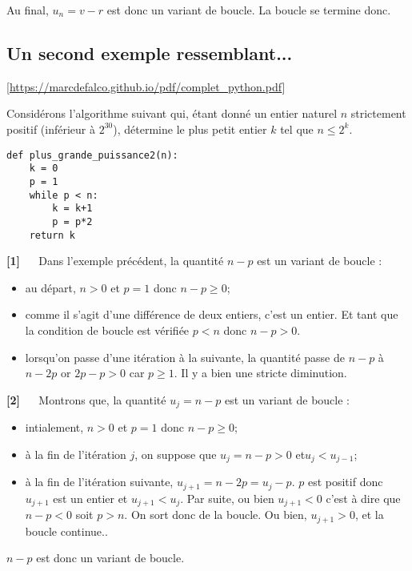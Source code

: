 Au final, $u_n = v-r$ est donc un variant de boucle. La boucle se termine donc.


\subsection{Un second exemple ressemblant...} 

\begin{flushright}
\footnotesize
[\url{https://marcdefalco.github.io/pdf/complet_python.pdf}]
\normalsize
\end{flushright}

Considérons l’algorithme suivant qui, étant donné un entier naturel $n$ strictement positif (inférieur à $2^{30}$), détermine le plus petit entier $k$ tel que $n \leq 2^k$.
\begin{lstlisting}
def plus_grande_puissance2(n):
    k = 0
    p = 1
    while p < n:
        k = k+1
        p = p*2
    return k
\end{lstlisting}
\begin{demo}\textbf{[1]} $\quad$
Dans l’exemple précédent, la quantité $n - p$ est un variant de boucle :
\begin{itemize}
\item au départ, $n > 0$ et $p = 1$ donc $n - p \geq 0$;
\item comme il s’agit d’une différence de deux entiers, c’est un entier. Et tant que la condition
de boucle est vérifiée $p < n$ donc $n - p > 0$.
\item lorsqu’on passe d’une itération à la suivante, la quantité passe de $n-p$ à $n-2p$ or $2p-p > 0$
car $p \geq 1$. Il y a bien une stricte diminution.
\end{itemize}
\end{demo}

\begin{demo}\textbf{[2]} $\quad$
Montrons que, la quantité $u_j = n - p$ est un variant de boucle :
\begin{itemize}
\item intialement, $n > 0$ et $p = 1$ donc $n - p \geq 0$;
\item à la fin de l'itération $j$, on suppose que $u_j = n - p >0 $ et$u_j < u_{j-1}$;
\item à la fin de l'itération suivante, $u_{j+1}=n-2p = u_j - p$. $p$ est positif donc $u_{j+1}$ est un entier et $u_{j+1}<u_j$. Par suite, ou bien $u_{j+1}<0$ c'est à dire que $n-p<0$ soit $p>n$. On sort donc de la boucle. Ou bien, $u_{j+1}>0$, et la boucle continue..
\end{itemize}
$n - p$ est donc un variant de boucle.
\end{demo}

